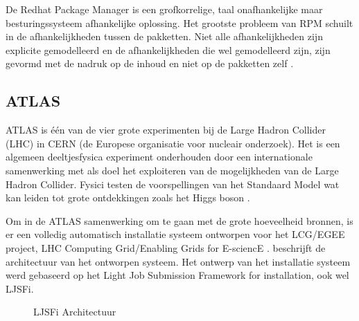 De Redhat Package Manager is een grofkorrelige, taal onafhankelijke maar besturingssysteem afhankelijke oplossing.
Het grootste probleem van RPM schuilt in de afhankelijkheden tussen de pakketten.
Niet alle afhankelijkheden zijn explicite gemodelleerd en de afhankelijkheden die wel gemodelleerd zijn, zijn gevormd met de nadruk op de inhoud en niet op de pakketten zelf \citep{softwareDeployment}.  

\subsection{ATLAS}\label{sec:ATLAS}
ATLAS is één van de vier grote experimenten bij de Large Hadron Collider (LHC) in CERN (de Europese organisatie voor nucleair onderzoek).
Het is een algemeen deeltjesfysica experiment onderhouden door een internationale samenwerking met als doel het exploiteren van de mogelijkheden van de Large Hadron Collider.
Fysici testen de voorspellingen van het Standaard Model \cite{standardModel} wat kan leiden tot grote ontdekkingen zoals het Higgs  boson \cite{atlas}.

Om in de ATLAS samenwerking om te gaan met de grote hoeveelheid bronnen, is er een volledig automatisch installatie systeem ontworpen voor het LCG/EGEE project, LHC Computing Grid/Enabling Grids for E-sciencE \citep{bird2005lhc}. 
\citet{salvo2008atlas} beschrijft de architectuur van het ontworpen systeem.
Het ontwerp van het installatie systeem werd gebaseerd op het Light Job Submission Framework for installation, ook wel LJSFi.

\begin{figure}[!ht]
\centering
{}
\caption{LJSFi Architectuur \citep{salvo2008atlas}}
\label{fig:ljsfiArchi}
\end{figure}

